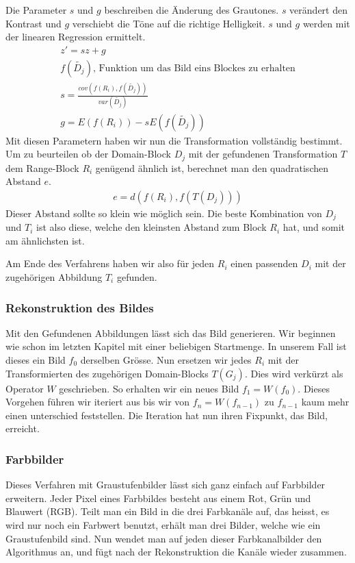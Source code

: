 Die Parameter $s$ und $g$ beschreiben die Änderung des Grautones. $s$ verändert den Kontrast und $g$ verschiebt die Töne auf die richtige Helligkeit. 
$s$ und $g$ werden mit der linearen Regression ermittelt. 
\begin{align*}
	z' = sz + g \\
	f(\tilde{D_j}) \text{, Funktion um das Bild eins Blockes zu erhalten}  \\
	s = \frac{cov(f(R_i), f(\tilde{D_j}))}{var(\tilde{D_j})} \\
	g = E(f(R_i)) - s E(f(\tilde{D_j}))
\end{align*}
Mit diesen Parametern haben wir nun die Transformation vollständig bestimmt.
Um zu beurteilen ob der Domain-Block $D_j$ mit der gefundenen Transformation $T$ dem Range-Block $R_i$ genügend ähnlich ist, berechnet man den quadratischen Abstand $e$.
\begin{align*}
	e = d(f(R_i), f(T(D_j)))
\end{align*}
Dieser Abstand sollte so klein wie möglich sein.
Die beste Kombination von $D_j$ und $T_i$ ist also diese, welche den kleinsten Abstand zum Block $R_i$ hat, und somit am ähnlichsten ist.

Am Ende des Verfahrens haben wir also für jeden $R_i$ einen passenden $D_i$ mit der zugehörigen Abbildung $T_i$ gefunden.

\subsubsection{Rekonstruktion des Bildes}
Mit den Gefundenen Abbildungen lässt sich das Bild generieren.
Wir beginnen wie schon im letzten Kapitel mit einer beliebigen Startmenge.
In unserem Fall ist dieses ein Bild  $f_0$ derselben Grösse.
Nun ersetzen wir jedes $R_i$ mit der Transformierten des zugehörigen Domain-Blocks $T(G_j)$.
Dies wird verkürzt als Operator $W$ geschrieben.
So erhalten wir ein neues Bild $f_1 = W(f_0)$.
Dieses Vorgehen führen wir iteriert aus bis wir von $f_n = W(f_{n-1})$ zu $f_{n-1}$ kaum mehr einen unterschied feststellen. Die Iteration hat nun ihren Fixpunkt, das Bild, erreicht.

\subsubsection{Farbbilder}
Dieses Verfahren mit Graustufenbilder lässt sich ganz einfach auf Farbbilder erweitern.
Jeder Pixel eines Farbbildes besteht aus einem Rot, Grün und Blauwert (RGB).
Teilt man ein Bild in die drei Farbkanäle auf, das heisst, es wird nur noch ein Farbwert benutzt, erhält man drei Bilder, welche wie ein Graustufenbild sind.
Nun wendet man auf jeden dieser Farbkanalbilder den Algorithmus an, und fügt nach der Rekonstruktion die Kanäle wieder zusammen. 

